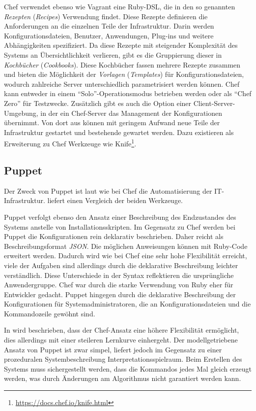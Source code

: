 Chef verwendet ebenso wie Vagrant eine Ruby-DSL, die in den so genannten \emph{Rezepten} (\emph{Recipes}) Verwendung findet.
Diese Rezepte definieren die Anforderungen an die einzelnen Teile der Infrastruktur. Darin werden Konfigurationsdateien, Benutzer, Anwendungen, Plug-ins und weitere Abhängigkeiten spezifiziert.
Da diese Rezepte mit steigender Komplexität des Systems an Übersichtlichkeit verlieren, gibt es die Gruppierung dieser in \emph{Kochbücher} (\emph{Cookbooks}).
Diese Kochbücher fassen mehrere Rezepte zusammen und bieten die Möglichkeit der \emph{Vorlagen} (\emph{Templates}) für Konfigurationsdateien, wodurch zahlreiche Server unterschiedlich parametrisiert werden können.
Chef kann entweder in einem "`Solo"'-Operationsmodus betrieben werden oder als "`Chef Zero"' für Testzwecke. Zusätzlich gibt es auch die Option einer Client-Server-Umgebung, in der ein Chef-Server das Management der Konfigurationen übernimmt.
Von dort aus können mit geringem Aufwand neue Teile der Infrastruktur gestartet und bestehende gewartet werden. Dazu existieren als Erweiterung zu Chef Werkzeuge wie Knife\footnote{\url{https://docs.chef.io/knife.html}}.

\subsection{Puppet}
\label{sub:puppet}
Der Zweck von Puppet ist laut \autocite{Puppet:online} wie bei Chef die Automatisierung der IT-Infrastruktur. \autocite{Wolff201604} liefert einen Vergleich der beiden Werkzeuge.

Puppet verfolgt ebenso den Ansatz einer Beschreibung des Endzustandes des Systems anstelle von Installationsskripten.
Im Gegensatz zu Chef werden bei Puppet die Konfigurationen rein deklarativ beschrieben.
Daher reicht als Beschreibungsformat \emph{JSON}.
Die möglichen Anweisungen können mit Ruby-Code erweitert werden.
Dadurch wird wie bei Chef eine sehr hohe Flexibilität erreicht, viele der Aufgaben sind allerdings durch die deklarative Beschreibung leichter verständlich.
Diese Unterschiede in der Syntax reflektieren die ursprüngliche Anwendergruppe.
Chef war durch die starke Verwendung von Ruby eher für Entwickler gedacht.
Puppet hingegen durch die deklarative Beschreibung der Konfigurationen für Systemadministratoren, die an Konfigurationsdateien und die Kommandozeile gewöhnt sind.

In \autocite{chef-vs-puppet:online} wird beschrieben, dass der Chef-Ansatz eine höhere Flexibilität ermöglicht, dies allerdings mit einer steileren Lernkurve einhergeht.
Der modellgetriebene Ansatz von Puppet ist zwar simpel, liefert jedoch im Gegensatz zu einer prozeduralen Systembeschreibung Interpretationsspielraum.
Beim Erstellen des Systems muss sichergestellt werden, dass die Kommandos jedes Mal gleich erzeugt werden, was durch Änderungen am Algorithmus nicht garantiert werden kann.

